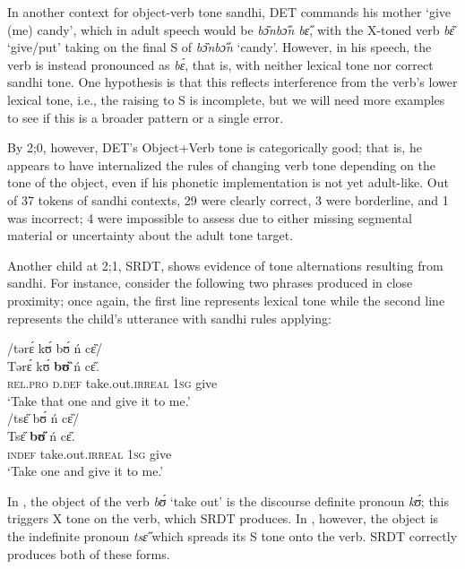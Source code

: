 \documentclass[output=paper,colorlinks,citecolor=brown,
]{langscibook}
\begin{document}
In another context for object-verb tone sandhi, DET commands his mother `give (me) candy', which in adult speech would be \textit{bɔ̏nbɔ̋n bɛ̋}, with the X-toned verb \textit{bɛ̏} `give/put' taking on the final S of \textit{bɔ̏nbɔ̋n} `candy'. However, in his speech, the verb is instead pronounced as \textit{bɛ́}, that is, with neither lexical tone nor correct sandhi tone. One hypothesis is that this reflects interference from the verb's lower lexical tone, i.e., the raising to S is incomplete, but we will need more examples to see if this is a broader pattern or a single error. 

By 2;0, however, DET's Object+Verb tone is categorically good; that is, he appears to have internalized the rules of changing verb tone depending on the tone of the object, even if his phonetic implementation is not yet adult-like. Out of 37 tokens of sandhi contexts, 29 were clearly correct, 3 were borderline, and 1 was incorrect; 4 were impossible to assess due to either missing segmental material or uncertainty about the adult tone target. 

Another child at 2;1, SRDT, shows evidence of tone alternations resulting from sandhi. For instance, consider the following two phrases produced in close proximity; once again, the first line represents lexical tone while the second line represents the child's utterance with sandhi rules applying:

\ea
\begin{xlist}
    \ex\label{ex:mcpherson:SRDTa}
    \glll /tərɛ́ kʊ́ bʊ́ ń cɛ̏/ \\
    Tərɛ́ kʊ́ \textbf{bʊ̏} ń cɛ̋. \\
    \textsc{rel.pro} \textsc{d.def} take.out.\textsc{irreal} \textsc{1sg} give \\
    \glt `Take that one and give it to me.' \\

    \ex\label{ex:mcpherson:SRDTb} 
    \glll /tsɛ̋ bʊ́ ń cɛ̏/ \\
    Tsɛ̋ \textbf{bʊ̋} ń cɛ̋. \\
    \textsc{indef} take.out.\textsc{irreal} \textsc{1sg} give \\
    \glt `Take one and give it to me.' \\
\end{xlist}

\z

\noindent In , the object of the verb \textit{bʊ́} `take out' is the discourse definite pronoun \textit{kʊ́}; this triggers X tone on the verb, which SRDT produces. In , however, the object is the indefinite pronoun \textit{tsɛ̋} which spreads its S tone onto the verb. SRDT correctly produces both of these forms. 
\end{document}
